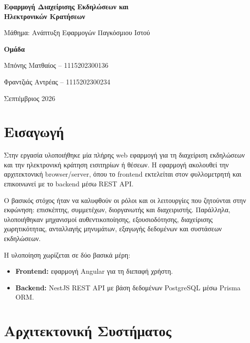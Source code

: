 \documentclass[11pt,a4paper]{article}
\begin{document}
\begin{titlepage}
  \centering
  \vspace*{3cm}
  {\LARGE\bfseries Εφαρμογή Διαχείρισης Εκδηλώσεων και\\[4pt] Ηλεκτρονικών Κρατήσεων\par}
  \vspace{1.5cm}
  {\large Μάθημα: Ανάπτυξη Εφαρμογών Παγκόσμιου Ιστού\par}
  \vspace{2cm}
  {\large\bfseries Ομάδα\par}
  \vspace{0.4cm}
  {\large Μπόνης Ματθαίος -- 1115202300136\par}
  {\large Φραντζιάς Αντρέας -- 1115202300234\par}
  \vfill
  {\large Σεπτέμβριος 2026\par}
\end{titlepage}

\tableofcontents
\newpage

\section{Εισαγωγή}

Στην εργασία υλοποιήθηκε μία πλήρης web εφαρμογή για τη διαχείριση εκδηλώσεων και την
ηλεκτρονική κράτηση εισιτηρίων ή θέσεων. Η εφαρμογή ακολουθεί την αρχιτεκτονική
browser/server, όπου το frontend εκτελείται στον φυλλομετρητή και επικοινωνεί με το
backend μέσω REST API.

Ο βασικός στόχος ήταν να καλυφθούν οι ρόλοι και οι λειτουργίες που ζητούνται στην
εκφώνηση: επισκέπτης, συμμετέχων, διοργανωτής και διαχειριστής. Παράλληλα, υλοποιήθηκαν
μηχανισμοί αυθεντικοποίησης, εξουσιοδότησης, διαχείρισης χωρητικότητας, ανταλλαγής
μηνυμάτων, εξαγωγής δεδομένων και συστάσεων εκδηλώσεων.

Η υλοποίηση χωρίζεται σε δύο βασικά μέρη:
\begin{itemize}
  \item \textbf{Frontend:} εφαρμογή Angular για τη διεπαφή χρήστη.
  \item \textbf{Backend:} NestJS REST API με βάση δεδομένων PostgreSQL μέσω Prisma ORM.
\end{itemize}

\section{Αρχιτεκτονική Συστήματος}
\end{document}
